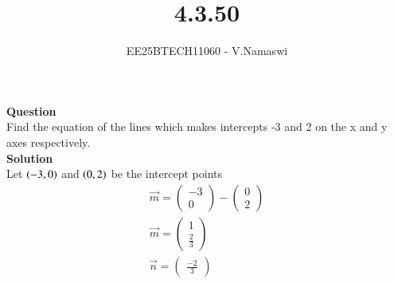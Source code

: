 \documentclass[journal]{IEEEtran}
\begin{document}

\vspace{3cm}

\title{4.3.50}
\author{EE25BTECH11060 - V.Namaswi}
{\let\newpage\relax\maketitle}

\renewcommand{\thefigure}{\theenumi}
\renewcommand{\thetable}{\theenumi}
\setlength{\intextsep}{10pt} %
\textbf{Question}\\ Find the equation of the lines which makes intercepts -3 and 2 on the x and y axes respectively.\\
\textbf{Solution}\\
Let $\left(-3,0\right)$  and  $\left(0,2\right)$  be the intercept points\\
\begin{align}
\Vec{m}=\begin{pmatrix}
    -3 \\ 0
\end{pmatrix}-\begin{pmatrix}
    0  \\  2
\end{pmatrix}\\
\Vec{m}=\begin{pmatrix}
    1 \\ \frac{2}{3}
\end{pmatrix}\\
\Vec{n}=\begin{pmatrix}
    \frac{-2}{3} 
\end{pmatrix}
\end{align}
\end{document}
